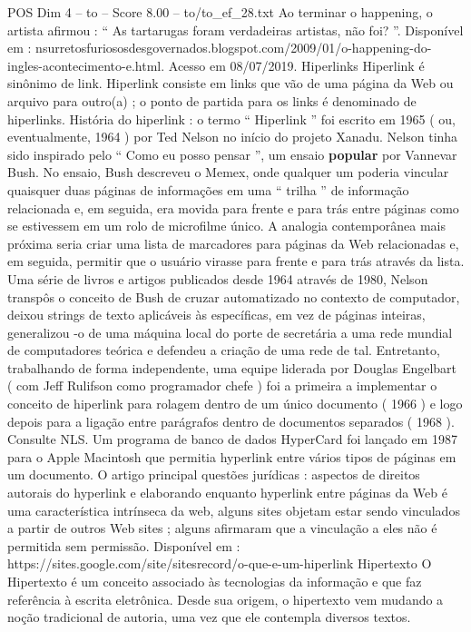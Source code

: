\begin{textsample}{POS Dim 4 – to – Score 8.00 – to/to\_ef\_28.txt}
Ao terminar o happening, o artista afirmou : “ As tartarugas foram verdadeiras artistas, não foi? ”.
Disponível em : nsurretosfuriososdesgovernados.blogspot.com/2009/01/o-happening-do-ingles-acontecimento-e.html.
Acesso em 08/07/2019.
Hiperlinks Hiperlink é sinônimo de link.
Hiperlink consiste em links que vão de uma página da Web ou arquivo para outro(a) ; o ponto de partida para os links é denominado de hiperlinks.
História do hiperlink : o termo “ Hiperlink ” foi escrito em 1965 ( ou, eventualmente, 1964 ) por Ted Nelson no início do projeto Xanadu.
Nelson tinha sido inspirado pelo “ Como eu posso pensar ”, um ensaio \textbf{popular} por Vannevar Bush.
No ensaio, Bush descreveu o Memex, onde qualquer um poderia vincular quaisquer duas páginas de informações em uma “ trilha ” de informação relacionada e, em seguida, era movida para frente e para trás entre páginas como se estivessem em um rolo de microfilme único.
A analogia contemporânea mais próxima seria criar uma lista de marcadores para páginas da Web relacionadas e, em seguida, permitir que o usuário virasse para frente e para trás através da lista.
Uma série de livros e artigos publicados desde 1964 através de 1980, Nelson transpôs o conceito de Bush de cruzar automatizado no contexto de computador, deixou strings de texto aplicáveis às específicas, em vez de páginas inteiras, generalizou -o de uma máquina local do porte de secretária a uma rede mundial de computadores teórica e defendeu a criação de uma rede de tal.
Entretanto, trabalhando de forma independente, uma equipe liderada por Douglas Engelbart ( com Jeff Rulifson como programador chefe ) foi a primeira a implementar o conceito de hiperlink para rolagem dentro de um único documento ( 1966 ) e logo depois para a ligação entre parágrafos dentro de documentos separados ( 1968 ).
Consulte NLS.
Um programa de banco de dados HyperCard foi lançado em 1987 para o Apple Macintosh que permitia hyperlink entre vários tipos de páginas em um documento.
O artigo principal questões jurídicas : aspectos de direitos autorais do hyperlink e elaborando enquanto hyperlink entre páginas da Web é uma característica intrínseca da web, alguns sites objetam estar sendo vinculados a partir de outros Web sites ; alguns afirmaram que a vinculação a eles não é permitida sem permissão.
Disponível em : https://sites.google.com/site/sitesrecord/o-que-e-um-hiperlink Hipertexto O Hipertexto é um conceito associado às tecnologias da informação e que faz referência à escrita eletrônica.
Desde sua origem, o hipertexto vem mudando a noção tradicional de autoria, uma vez que ele contempla diversos textos.

\end{textsample}
